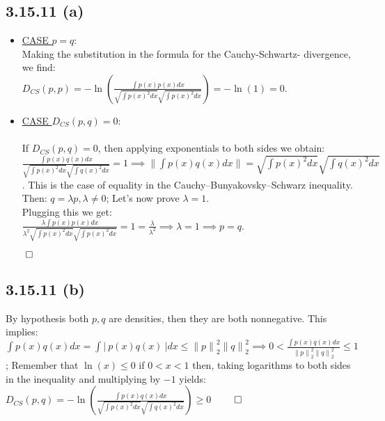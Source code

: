 \documentclass{exam}
\renewenvironment{proof}{{\noindent\itshape\ignorespaces}}{{\hfill$\qed$\\}}
\begin{document}
\subsection*{3.15.11 (a)}
\begin{proof}  
    \begin{itemize}
        \item \underline{CASE $p=q$}:\newline
        \\
        Making the substitution in the formula for the Cauchy-Schwartz- divergence, we find:\\
        $D_{CS}(p,p) = -\ln(\displaystyle\frac{\int p(x) p(x) d x}{\sqrt{\int p(x)^2 d x } \sqrt{\int p(x)^2 d x }}) = - \ln(1) = 0.$
        \item \underline{CASE $D_{CS}(p,q) = 0$}:\\
        \\
        If $D_{CS}(p,q) = 0$, then applying exponentials to both sides we obtain:\newline
        $\displaystyle\frac{\displaystyle \int p(x) q(x) d x}{\sqrt{\displaystyle\int p(x)^2 d x } \sqrt{\displaystyle\int q(x)^2 d x }} = 1 \implies \lVert \displaystyle\int p(x) q(x) d x \lVert = \sqrt{\displaystyle \int p(x)^2 d x } \sqrt{\displaystyle \int q(x)^2 d x }$. This is the case of equality in
        the Cauchy–Bunyakovsky–Schwarz inequality. Then: $q = \lambda p, \lambda \neq 0$; Let's now prove $\lambda = 1$.
        \\
        Plugging this we get: \\
        $\displaystyle\frac{\displaystyle \lambda \int p(x) p(x) d x}{\lambda^{2} \sqrt{\displaystyle\int p(x)^2 d x } \sqrt{\displaystyle\int p(x)^2 d x }} = 1 = \frac{\lambda}{\lambda^{2}} \implies \lambda  = 1 \implies p = q.$
    \end{itemize}  
\end{proof}

\subsection*{3.15.11 (b)}
By hypothesis both $p, q$ are densities, then they are both nonnegative. This implies: \\

\begin{proof} 
    $\displaystyle \int p(x) q(x) d x  = \displaystyle \int \left| \ p(x) q(x) \ \right| d x \leq  {\lVert p \lVert}^{2}_{2} {\lVert q \lVert}^{2}_{2} \implies 0 < \displaystyle\frac{\displaystyle \int p(x) q(x) d x}{{\lVert p \lVert}^{2}_{2} {\lVert q \lVert}^{2}_{2}} \leq 1$; Remember that $\ln(x) \leq 0 $ if $0<x<1$ then, taking logarithms to both sides in the inequality and
    multiplying by $-1$ yields:\\
    $D_{CS}(p,q) = -\ln(\displaystyle \frac{\displaystyle \int p(x) q(x) d x }{\displaystyle\sqrt{\int p(x)^2 d x } \displaystyle\sqrt{\int q(x)^2 d x }}) \geq 0$
\end{proof} 
\end{document}
